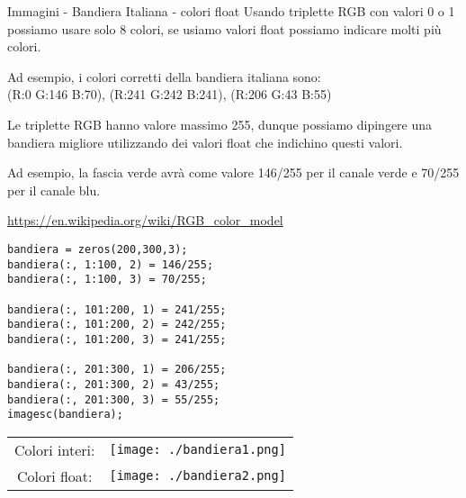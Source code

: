 \documentclass[format=169, handout]{beamer}
\begin{document}
\begin{frame}{Immagini - Bandiera Italiana - colori float}
Usando triplette RGB con valori 0 o 1 possiamo usare solo 8 colori, se usiamo valori float possiamo indicare molti più colori.

Ad esempio, i colori corretti della bandiera italiana sono:\\
(R:0 G:146 B:70), (R:241 G:242 B:241), (R:206 G:43 B:55)

Le triplette RGB hanno valore massimo 255, dunque possiamo dipingere una bandiera migliore utilizzando dei valori float che indichino questi valori.

Ad esempio, la fascia verde avrà come valore 146/255 per il canale verde e 70/255 per il canale blu.

\url{https://en.wikipedia.org/wiki/RGB_color_model}

\pause

\begin{lstlisting}[style=matlab]
bandiera = zeros(200,300,3);
bandiera(:, 1:100, 2) = 146/255;
bandiera(:, 1:100, 3) = 70/255;

bandiera(:, 101:200, 1) = 241/255;
bandiera(:, 101:200, 2) = 242/255;
bandiera(:, 101:200, 3) = 241/255;

bandiera(:, 201:300, 1) = 206/255;
bandiera(:, 201:300, 2) = 43/255;
bandiera(:, 201:300, 3) = 55/255;
imagesc(bandiera);
\end{lstlisting}

\pause
\centering
\begin{tabular}{cc}
	Colori interi: & \texttt{[image: ./bandiera1.png]} \\
	Colori float: & \texttt{[image: ./bandiera2.png]} \\
\end{tabular}
\end{frame}
\end{document}
